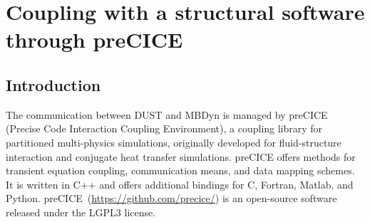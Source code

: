 \chapter{Coupling with a structural software through preCICE}
\section{Introduction}
The communication between DUST and MBDyn is managed by preCICE 
(Precise Code Interaction Coupling Environment), a coupling library for partitioned 
multi-physics simulations, originally developed for fluid-structure interaction 
and conjugate heat transfer simulations.
preCICE offers methods for transient equation coupling, communication means, 
and data mapping schemes. It is written in C++ and offers additional bindings 
for C, Fortran, Matlab, and Python.
preCICE~(\url{https://github.com/precice/}) is an open-source software released 
under the LGPL3 license. 
